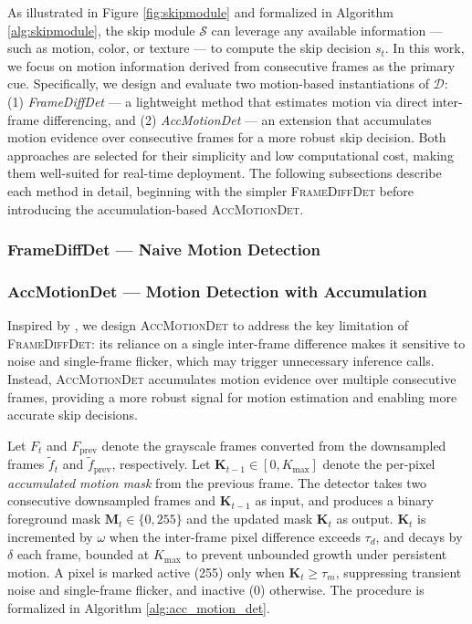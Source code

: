 \documentclass[
  10pt,
]{article}
\begin{document}
As illustrated in Figure \ref{fig:skipmodule} and formalized in
Algorithm \ref{alg:skipmodule}, the skip module \(\mathcal{S}\) can
leverage any available information --- such as motion, color, or texture
--- to compute the skip decision \(s_t\). In this work, we focus on
motion information derived from consecutive frames as the primary cue.
Specifically, we design and evaluate two motion-based instantiations of
\(\mathcal{D}\): (1) \textit{FrameDiffDet} --- a lightweight method that
estimates motion via direct inter-frame differencing, and (2)
\textit{AccMotionDet} --- an extension that accumulates motion evidence
over consecutive frames for a more robust skip decision. Both approaches
are selected for their simplicity and low computational cost, making
them well-suited for real-time deployment. The following subsections
describe each method in detail, beginning with the simpler
\textsc{FrameDiffDet} before introducing the accumulation-based
\textsc{AccMotionDet}.

\subsubsection{FrameDiffDet --- Naive Motion
Detection}\label{framediffdet-naive-motion-detection}



\subsubsection{AccMotionDet --- Motion Detection with
Accumulation}\label{accmotiondet-motion-detection-with-accumulation}

Inspired by , we design
\textsc{AccMotionDet} to address the key limitation of
\textsc{FrameDiffDet}: its reliance on a single inter-frame difference
makes it sensitive to noise and single-frame flicker, which may trigger
unnecessary inference calls. Instead, \textsc{AccMotionDet} accumulates
motion evidence over multiple consecutive frames, providing a more
robust signal for motion estimation and enabling more accurate skip
decisions.

Let \(F_t\) and \(F_{\text{prev}}\) denote the grayscale frames
converted from the downsampled frames \(\tilde{f}_t\) and
\(\tilde{f}_{\text{prev}}\), respectively. Let
\(\mathbf{K}_{t-1} \in [0, K_{\max}]\) denote the per-pixel
\textit{accumulated motion mask} from the previous frame. The detector
takes two consecutive downsampled frames and \(\mathbf{K}_{t-1}\) as
input, and produces a binary foreground mask
\(\mathbf{M}_t \in \{0, 255\}\) and the updated mask \(\mathbf{K}_t\) as
output. \(\mathbf{K}_t\) is incremented by \(\omega\) when the
inter-frame pixel difference exceeds \(\tau_d\), and decays by
\(\delta\) each frame, bounded at \(K_{\max}\) to prevent unbounded
growth under persistent motion. A pixel is marked active (255) only when
\(\mathbf{K}_t \geq \tau_m\), suppressing transient noise and
single-frame flicker, and inactive (0) otherwise. The procedure is
formalized in Algorithm \ref{alg:acc_motion_det}.
\end{document}
